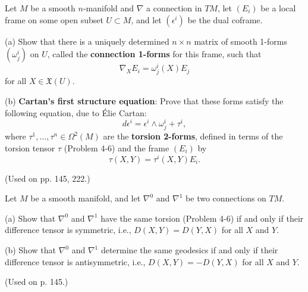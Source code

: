 \begin{exercise}
\label{prob:connection-1forms-cartan}
Let $M$ be a smooth $n$-manifold and $\nabla$ a connection in $TM$, let $(E_i)$ be a local frame on some open subset $U \subset M$, and let $(\epsilon^i)$ be the dual coframe.

(a) Show that there is a uniquely determined $n \times n$ matrix of smooth 1-forms $(\omega^i_j)$ on $U$, called the \textbf{connection 1-forms} for this frame, such that
\[
\nabla_X E_i = \omega^i_j(X) E_j
\]
for all $X \in \mathfrak{X}(U)$.

(b) \textbf{Cartan's first structure equation}: Prove that these forms satisfy the following equation, due to \'Elie Cartan:
\[
d\epsilon^i = \epsilon^i \wedge \omega^i_j + \tau^i,
\]
where $\tau^1, \ldots, \tau^n \in \Omega^2(M)$ are the \textbf{torsion 2-forms}, defined in terms of the torsion tensor $\tau$ (Problem 4-6) and the frame $(E_i)$ by
\[
\tau(X,Y) = \tau^i(X,Y) E_i.
\]

(Used on pp. 145, 222.)
\end{exercise}

\begin{exercise}
\label{prob:connections-difference-tensor}

Let $M$ be a smooth manifold, and let $\nabla^0$ and $\nabla^1$ be two connections on $TM$.

(a) Show that $\nabla^0$ and $\nabla^1$ have the same torsion (Problem 4-6) if and only if their difference tensor is symmetric, i.e., $D(X,Y) = D(Y,X)$ for all $X$ and $Y$.

(b) Show that $\nabla^0$ and $\nabla^1$ determine the same geodesics if and only if their difference tensor is antisymmetric, i.e., $D(X,Y) = -D(Y,X)$ for all $X$ and $Y$.

(Used on p. 145.)
\end{exercise}

